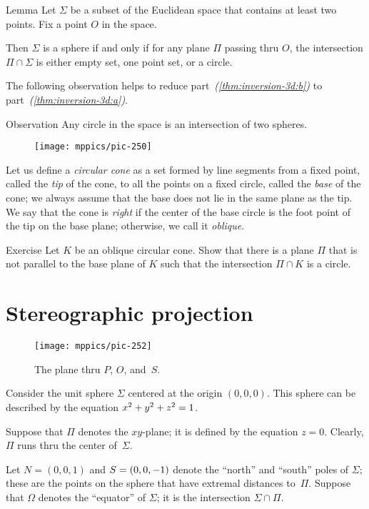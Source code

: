 \begin{thm}{Lemma}
Let $\Sigma$ be a subset of the Euclidean space
that contains at least two points.
Fix a point $O$ in the space.

Then $\Sigma$ is 
a sphere 
if and only if
for any plane $\Pi$ passing thru $O$,
the intersection $\Pi\cap \Sigma$ is either empty set,
one point set, or a circle.
\end{thm}  

The following observation helps to reduce part~\textit{(\ref{thm:inversion-3d:b})} to part~\textit{(\ref{thm:inversion-3d:a})}.

\begin{thm}{Observation}
Any circle in the space is an intersection of two spheres.
\end{thm}

{

\begin{wrapfigure}{o}{25mm}
\centering
\texttt{[image: mppics/pic-250]}
\end{wrapfigure}

Let us define a \emph{circular cone} as a set formed by line segments from a fixed point, called the \emph{tip} of the cone, to all the points on a fixed circle, called the \emph{base} of the cone;
we always assume that the base does not lie in the same plane as the tip.
We say that the cone is \emph{right} 
if the center of the base circle is the foot point of the tip on the base plane;
otherwise, we call it \emph{oblique}.

}

\begin{thm}{Exercise}\label{ex:cone}
Let $K$ be an oblique circular cone. Show that there is a plane $\Pi$ that is not parallel to the base plane of $K$ such that the intersection $\Pi\cap K$ is a circle.
\end{thm}


\section{Stereographic projection}

{

\begin{wrapfigure}{r}{48mm}
\vskip-10mm
\centering
\texttt{[image: mppics/pic-252]}
\caption*{The plane thru $P$, $O$, and~$S$.}
\end{wrapfigure}

Consider the unit sphere $\Sigma$ 
centered at the origin $(0,0,0)$.
This sphere can be described by the equation $x^2+y^2+z^2\z=1$. 

Suppose that $\Pi$ denotes the $xy$-plane;
it is defined by the equation $z = 0$.
Clearly, $\Pi$
runs thru the center of~$\Sigma$.

Let $N = (0, 0, 1)$ and $S\z=(0, 0, -1)$ denote the ``north'' and ``south'' poles of $\Sigma$;
these are the points on the sphere that have extremal distances to~$\Pi$.
Suppose that $\Omega$ denotes the ``equator'' of $\Sigma$;
it is the intersection $\Sigma\cap\Pi$.

}

